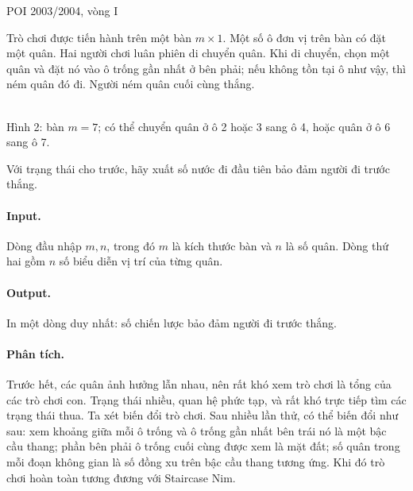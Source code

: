 \documentclass[11pt]{article}
\begin{document}
\begin{center}
POI 2003/2004, vòng I
\end{center}

Trò chơi được tiến hành trên một bàn \(m\times 1\). Một số ô đơn vị trên bàn có
đặt một quân. Hai người chơi luân phiên di chuyển quân. Khi di chuyển, chọn một
quân và đặt nó vào ô trống gần nhất ở bên phải; nếu không tồn tại ô như vậy,
thì ném quân đó đi. Người ném quân cuối cùng thắng.

\begin{center}
\\[-0.2em]
{\small Hình 2: bàn \(m=7\); có thể chuyển quân ở ô 2 hoặc 3 sang ô 4, hoặc
quân ở ô 6 sang ô 7.}
\end{center}

Với trạng thái cho trước, hãy xuất số nước đi đầu tiên bảo đảm người đi trước
thắng.

\paragraph{Input.}
Dòng đầu nhập \(m,n\), trong đó \(m\) là kích thước bàn và \(n\) là số quân.
Dòng thứ hai gồm \(n\) số biểu diễn vị trí của từng quân.

\paragraph{Output.}
In một dòng duy nhất: số chiến lược bảo đảm người đi trước thắng.

\paragraph{Phân tích.}
Trước hết, các quân ảnh hưởng lẫn nhau, nên rất khó xem trò chơi là tổng của
các trò chơi con. Trạng thái nhiều, quan hệ phức tạp, và rất khó trực tiếp tìm
các trạng thái thua. Ta xét biến đổi trò chơi. Sau nhiều lần thử, có thể biến
đổi như sau: xem khoảng giữa mỗi ô trống và ô trống gần nhất bên trái nó là một
bậc cầu thang; phần bên phải ô trống cuối cùng được xem là mặt đất; số quân
trong mỗi đoạn không gian là số đồng xu trên bậc cầu thang tương ứng. Khi đó
trò chơi hoàn toàn tương đương với Staircase Nim.
\end{document}
